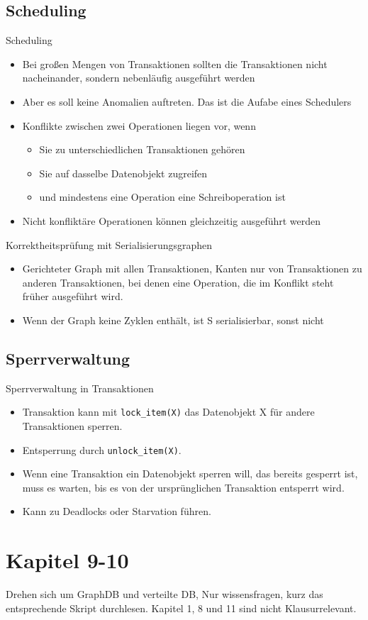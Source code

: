 \documentclass{article}
\begin{document}
\subsection*{Scheduling}
\begin{block}{Scheduling}
  \begin{itemize}
    \item Bei großen Mengen von Transaktionen sollten die Transaktionen nicht nacheinander, sondern nebenläufig ausgeführt werden
    \item Aber es soll keine Anomalien auftreten. Das ist die Aufabe eines Schedulers
    \item Konflikte zwischen zwei Operationen liegen vor, wenn
    \begin{itemize}
      \item Sie zu unterschiedlichen Transaktionen gehören
      \item Sie auf dasselbe Datenobjekt zugreifen
      \item und mindestens eine Operation eine Schreiboperation ist
    \end{itemize}
    \item Nicht konfliktäre Operationen können gleichzeitig ausgeführt werden
  \end{itemize}
\end{block}

\begin{block}{Korrektheitsprüfung mit Serialisierungsgraphen}
  \begin{itemize}
    \item Gerichteter Graph mit allen Transaktionen, Kanten nur von Transaktionen zu anderen Transaktionen, bei denen eine Operation, die im Konflikt steht früher ausgeführt wird.
    \item Wenn der Graph keine Zyklen enthält, ist S serialisierbar, sonst nicht
  \end{itemize}
\end{block}

\subsection*{Sperrverwaltung}
\begin{block}{Sperrverwaltung in Transaktionen}
  \begin{itemize}
    \item Transaktion kann mit \texttt{lock\_item(X)} das Datenobjekt X für andere Transaktionen sperren.
    \item Entsperrung durch \texttt{unlock\_item(X)}.
    \item Wenn eine Transaktion ein Datenobjekt sperren will, das bereits gesperrt ist, muss es warten, bis es von der ursprünglichen Transaktion entsperrt wird.
    \item Kann zu Deadlocks oder Starvation führen.
  \end{itemize}
\end{block}

\section{Kapitel 9-10}

Drehen sich um GraphDB und verteilte DB, Nur wissensfragen, kurz das entsprechende Skript durchlesen.
Kapitel 1, 8 und 11 sind nicht Klausurrelevant.
\end{document}
